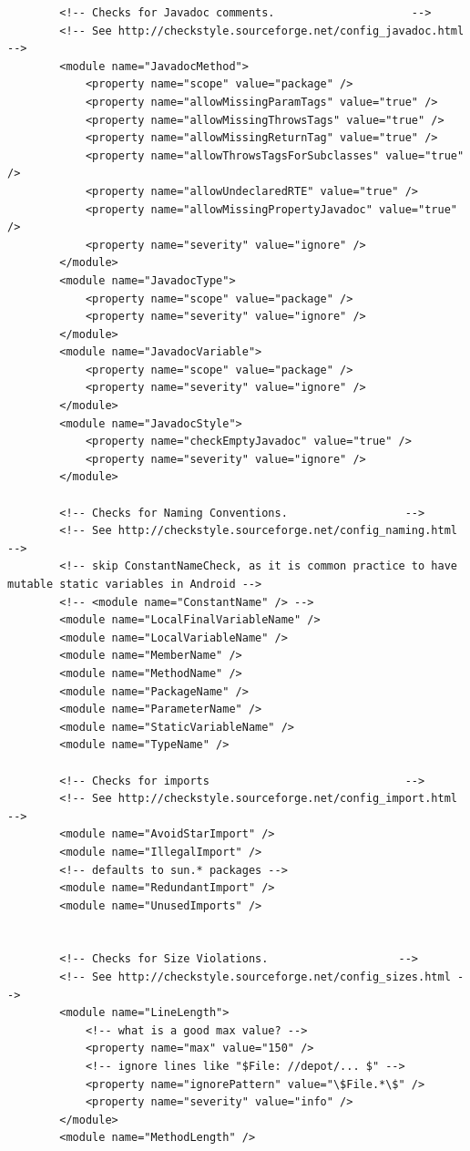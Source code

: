 \begin{lstlisting}
        <!-- Checks for Javadoc comments.                     -->
        <!-- See http://checkstyle.sourceforge.net/config_javadoc.html -->
        <module name="JavadocMethod">
            <property name="scope" value="package" />
            <property name="allowMissingParamTags" value="true" />
            <property name="allowMissingThrowsTags" value="true" />
            <property name="allowMissingReturnTag" value="true" />
            <property name="allowThrowsTagsForSubclasses" value="true" />
            <property name="allowUndeclaredRTE" value="true" />
            <property name="allowMissingPropertyJavadoc" value="true" />
            <property name="severity" value="ignore" />
        </module>
        <module name="JavadocType">
            <property name="scope" value="package" />
            <property name="severity" value="ignore" />
        </module>
        <module name="JavadocVariable">
            <property name="scope" value="package" />
            <property name="severity" value="ignore" />
        </module>
        <module name="JavadocStyle">
            <property name="checkEmptyJavadoc" value="true" />
            <property name="severity" value="ignore" />
        </module>

        <!-- Checks for Naming Conventions.                  -->
        <!-- See http://checkstyle.sourceforge.net/config_naming.html -->
        <!-- skip ConstantNameCheck, as it is common practice to have mutable static variables in Android -->
        <!-- <module name="ConstantName" /> -->
        <module name="LocalFinalVariableName" />
        <module name="LocalVariableName" />
        <module name="MemberName" />
        <module name="MethodName" />
        <module name="PackageName" />
        <module name="ParameterName" />
        <module name="StaticVariableName" />
        <module name="TypeName" />

        <!-- Checks for imports                              -->
        <!-- See http://checkstyle.sourceforge.net/config_import.html -->
        <module name="AvoidStarImport" />
        <module name="IllegalImport" />
        <!-- defaults to sun.* packages -->
        <module name="RedundantImport" />
        <module name="UnusedImports" />


        <!-- Checks for Size Violations.                    -->
        <!-- See http://checkstyle.sourceforge.net/config_sizes.html -->
        <module name="LineLength">
            <!-- what is a good max value? -->
            <property name="max" value="150" />
            <!-- ignore lines like "$File: //depot/... $" -->
            <property name="ignorePattern" value="\$File.*\$" />
            <property name="severity" value="info" />
        </module>
        <module name="MethodLength" />



\end{lstlisting}
